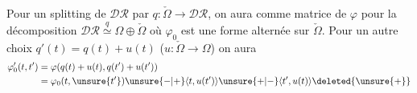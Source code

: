Pour un splitting de $\mathcal{DR}$ par $q:\check\Omega\to\mathcal{DR}$, on aura comme matrice de $\varphi$ pour la décomposition $\mathcal{DR}\overset{q}{\simeq}\Omega\oplus\check\Omega$
où $\varphi_0$ est une forme alternée sur $\check\Omega$. Pour un autre choix $q'(t)=q(t)+u(t)$ ($u:\check\Omega\to\Omega$) on aura
\[
\begin{aligned}
\varphi'_0(t,t')&=\varphi(q(t)+u(t),q(t')+u(t'))\\
&=\varphi_0(t,\unsure{t'})\unsure{-|+}\langle t,u(t')\rangle\unsure{+|-}\langle t',u(t)\rangle\deleted{\unsure{+}}
\end{aligned}
\]
